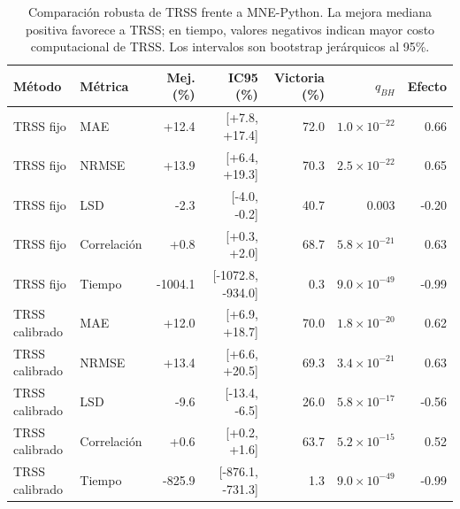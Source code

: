 \begin{table}[htbp]
\centering
\footnotesize
\caption[Comparación robusta TRSS--MNE]{Comparación robusta de TRSS frente a MNE-Python. La mejora mediana positiva favorece a TRSS; en tiempo, valores negativos indican mayor costo computacional de TRSS. Los intervalos son bootstrap jerárquicos al 95\%.}
\label{tab:ch6_robust_main}
\begin{tabular}{@{}llrrrrr@{}}
\toprule
Método & Métrica & Mej. (\%) & IC95 (\%) & Victoria (\%) & $q_{BH}$ & Efecto \\
\midrule
TRSS fijo & MAE & +12.4 & [+7.8, +17.4] & 72.0 & $1.0\times 10^{-22}$ & 0.66 \\
TRSS fijo & NRMSE & +13.9 & [+6.4, +19.3] & 70.3 & $2.5\times 10^{-22}$ & 0.65 \\
TRSS fijo & LSD & -2.3 & [-4.0, -0.2] & 40.7 & 0.003 & -0.20 \\
TRSS fijo & Correlación & +0.8 & [+0.3, +2.0] & 68.7 & $5.8\times 10^{-21}$ & 0.63 \\
TRSS fijo & Tiempo & -1004.1 & [-1072.8, -934.0] & 0.3 & $9.0\times 10^{-49}$ & -0.99 \\
\addlinespace
TRSS calibrado & MAE & +12.0 & [+6.9, +18.7] & 70.0 & $1.8\times 10^{-20}$ & 0.62 \\
TRSS calibrado & NRMSE & +13.4 & [+6.6, +20.5] & 69.3 & $3.4\times 10^{-21}$ & 0.63 \\
TRSS calibrado & LSD & -9.6 & [-13.4, -6.5] & 26.0 & $5.8\times 10^{-17}$ & -0.56 \\
TRSS calibrado & Correlación & +0.6 & [+0.2, +1.6] & 63.7 & $5.2\times 10^{-15}$ & 0.52 \\
TRSS calibrado & Tiempo & -825.9 & [-876.1, -731.3] & 1.3 & $9.0\times 10^{-49}$ & -0.99 \\
\bottomrule
\end{tabular}
\end{table}
